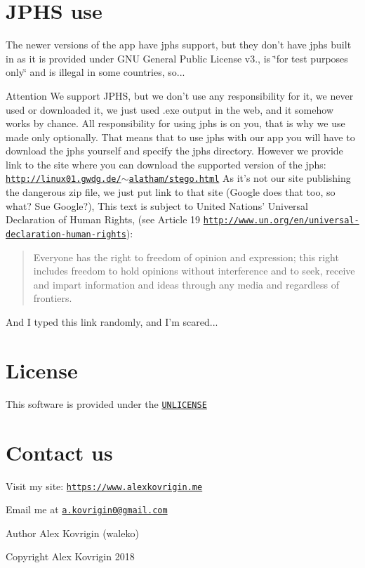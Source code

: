 \hypertarget{index_jphs-use}{}\section{J\-P\-H\-S use}\label{index_jphs-use}
The newer versions of the app have jphs support, but they don't have jphs built in as it is provided under G\-N\-U General Public License v3., is \char`\"{}for test purposes only\char`\"{} and is illegal in some countries, so... \begin{DoxyAttention}{Attention}
We support J\-P\-H\-S, but we don't use any responsibility for it, we never used or downloaded it, we just used .exe output in the web, and it somehow works by chance. All responsibility for using jphs is on you, that is why we use made only optionally. That means that to use jphs with our app you will have to download the jphs yourself and specify the jphs directory. However we provide link to the site where you can download the supported version of the jphs\-: \href{http://linux01.gwdg.de/~alatham/stego.html}{\tt http\-://linux01.\-gwdg.\-de/$\sim$alatham/stego.\-html} As it's not our site publishing the dangerous zip file, we just put link to that site (Google does that too, so what? Sue Google?), This text is subject to United Nations' Universal Declaration of Human Rights, (see Article 19 \href{http://www.un.org/en/universal-declaration-human-rights}{\tt http\-://www.\-un.\-org/en/universal-\/declaration-\/human-\/rights})\-: \begin{quotation}
Everyone has the right to freedom of opinion and expression; this right includes freedom to hold opinions without interference and to seek, receive and impart information and ideas through any media and regardless of frontiers.

\end{quotation}
And I typed this link randomly, and I'm scared...
\end{DoxyAttention}
\hypertarget{index_lic}{}\section{License}\label{index_lic}
This software is provided under the \href{http://unlicense.org}{\tt U\-N\-L\-I\-C\-E\-N\-S\-E}\hypertarget{index_contact}{}\section{Contact us}\label{index_contact}
Visit my site\-: \href{https://www.alexkovrigin.me}{\tt https\-://www.\-alexkovrigin.\-me}

Email me at \href{mailto:a.kovrigin0@gmail.com}{\tt a.\-kovrigin0@gmail.\-com}

\begin{DoxyAuthor}{Author}
Alex Kovrigin (waleko) 
\end{DoxyAuthor}
\begin{DoxyCopyright}{Copyright}
Alex Kovrigin 2018  
\end{DoxyCopyright}
